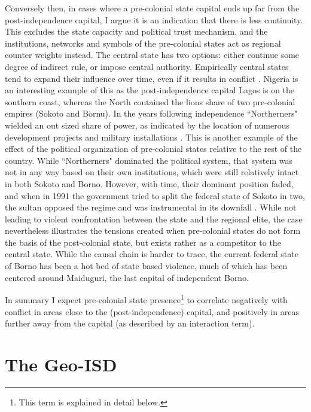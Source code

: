 \documentclass[12pt]{article}
\begin{document}
Conversely then, in cases where a pre-colonial state capital ends up far from
the post-independence capital, I argue it is an indication that there is less
continuity. This excludes the state capacity and political trust mechanism, and
the institutions, networks and symbols of the pre-colonial states act as
regional counter weights instead. The central state has two options: either
continue some degree of indirect rule, or impose central authority. Empirically
central states tend to expand their influence over time, even if it results in
conflict \citep{Ying_2020}. Nigeria is an interesting example of this as the
post-independence capital Lagos is on the southern coast, whereas the North
contained the lions share of two pre-colonial empires (Sokoto and
Bornu). In the years following independence ``Northerners" wielded an out sized
share of power, as indicated by the location of numerous development projects
and military installations \citep{Bates2008a}. This is another example of the
effect of the political organization of pre-colonial states relative to the rest
of the country. While ``Northerners" dominated the political system, that system
was not in any way based on their own institutions, which were still relatively
intact in both Sokoto and Borno. However, with time, their dominant position
faded, and when in 1991 the government tried to split the federal state of
Sokoto in two, the sultan opposed the regime and was instrumental in its
downfall \citep{HiribarrenVincent2017AHoB}. While not leading to violent
confrontation between the state and the regional elite, the case nevertheless
illustrates the tensions created when pre-colonial states do not form the basis
of the post-colonial state, but exists rather as a competitor to the central
state. While the causal chain is harder to trace, the current federal state of
Borno has been a hot bed of state based violence, much of which has been
centered around Maiduguri, the last capital of independent Borno.

In summary I expect pre-colonial state presence\footnote{This term is explained
in detail below.} to correlate negatively with conflict in areas close to the
(post-independence) capital, and positively in areas further away from the
capital (as described by an interaction term).

\section{The Geo-ISD}
\end{document}
